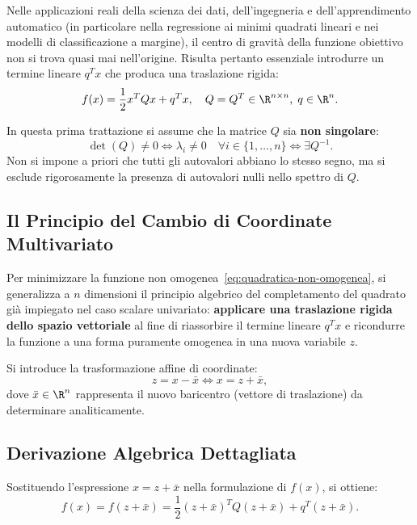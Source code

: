 Nelle applicazioni reali della scienza dei dati, dell'ingegneria e dell'apprendimento automatico (in particolare nella regressione ai minimi quadrati lineari e nei modelli di classificazione a margine), il centro di gravit\`a della funzione obiettivo non si trova quasi mai nell'origine. Risulta pertanto essenziale introdurre un termine lineare $q^T x$ che produca una traslazione rigida:
\begin{equation}
    f(x) = \frac{1}{2} x^T Q x + q^T x, \quad Q = Q^T \in \R^{n \times n}, \; q \in \R^n.
    \label{eq:quadratica-non-omogenea}
\end{equation}

In questa prima trattazione si assume che la matrice $Q$ sia \textbf{non singolare}:
\begin{equation}
    \det(Q) \neq 0 \iff \lambda_i \neq 0 \quad \forall i \in \{1, \dots, n\} \iff \exists Q^{-1}.
\end{equation}
Non si impone a priori che tutti gli autovalori abbiano lo stesso segno, ma si esclude rigorosamente la presenza di autovalori nulli nello spettro di $Q$.

\subsection{Il Principio del Cambio di Coordinate Multivariato}
Per minimizzare la funzione non omogenea~\eqref{eq:quadratica-non-omogenea}, si generalizza a $n$ dimensioni il principio algebrico del completamento del quadrato gi\`a impiegato nel caso scalare univariato: \textbf{applicare una traslazione rigida dello spazio vettoriale} al fine di riassorbire il termine lineare $q^T x$ e ricondurre la funzione a una forma puramente omogenea in una nuova variabile $z$.

Si introduce la trasformazione affine di coordinate:
\begin{equation}
    z = x - \bar{x} \iff x = z + \bar{x},
    \label{eq:cambio-coordinate-z}
\end{equation}
dove $\bar{x} \in \R^n$ rappresenta il nuovo baricentro (vettore di traslazione) da determinare analiticamente.

\subsection{Derivazione Algebrica Dettagliata}
Sostituendo l'espressione $x = z + \bar{x}$ nella formulazione di $f(x)$, si ottiene:
\begin{equation}
    f(x) = f(z + \bar{x}) = \frac{1}{2} (z + \bar{x})^T Q (z + \bar{x}) + q^T (z + \bar{x}).
\end{equation}

